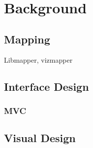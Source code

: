 \chapter{Background}

\section{Mapping}

	Libmapper, vizmapper
	
\section{Interface Design}
\subsection{MVC}


\section{Visual Design}



